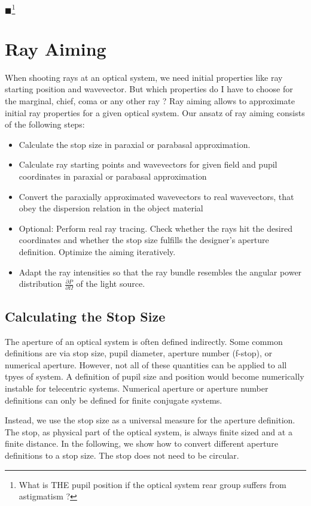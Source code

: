 \documentclass[12pt,a4paper,twoside,openright,BCOR10mm,headsepline,titlepage,abstracton,chapterprefix,final]{scrreprt}
\newcommand{\remark}[1]{{\color{red}$\blacksquare$}\footnote{{\color{red}#1}}}
\begin{document}
\remark{What is THE pupil position if the optical system rear group suffers from astigmatism ?}


\section{Ray Aiming}
When shooting rays at an optical system, we need initial properties like ray starting position and wavevector.
But which properties do I have to choose for the marginal, chief, coma or any other ray ?
Ray aiming allows to approximate initial ray properties for a given optical system.
Our ansatz of ray aiming consists of the following steps:
\begin{itemize}
 \item Calculate the stop size in paraxial or parabasal approximation.
 \item Calculate ray starting points and wavevectors for given field and pupil coordinates in paraxial or parabasal approximation
 \item Convert the paraxially approximated wavevectors to real wavevectors,
       that obey the dispersion relation in the object material
 \item Optional: Perform real ray tracing. Check whether the rays hit the desired coordinates 
       and whether the stop size fulfills the designer's aperture definition.
       Optimize the aiming iteratively.
 \item Adapt the ray intensities so that the ray bundle resembles the angular power distribution $\frac{\partial P}{\partial \Omega}$ of the light source.
\end{itemize}

\subsection{Calculating the Stop Size}
The aperture of an optical system is often defined indirectly.
Some common definitions are via stop size, pupil diameter, aperture number (f-stop), or numerical aperture.
However, not all of these quantities can be applied to all tpyes of system.
A definition of pupil size and position would become numerically instable for telecentric systems.
Numerical aperture or aperture number definitions can only be defined for finite conjugate systems.

Instead, we use the stop size as a universal measure for the aperture definition.
The stop, as physical part of the optical system, is always finite sized and at a finite distance.
In the following, we show how to convert different aperture definitions to a stop size.
The stop does not need to be circular. 
\end{document}
